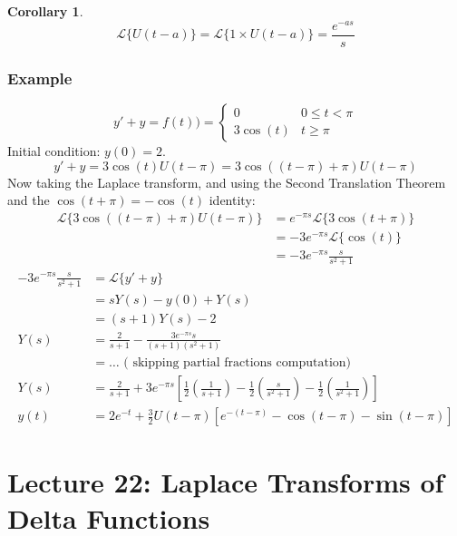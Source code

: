 \documentclass[11pt]{article}
\newtheorem{cor}[thm]{Corollary}
\newcommand{\lap}{\mathcal{L}}
\begin{document}
	\begin{cor}
		\[
			\lap\{ U(t-a) \} = \lap\{ 1 \times U(t-a) \} = \frac{e^{-as}}{s}
		\]
	\end{cor}

\subsubsection{Example}
		\[
			y' + y = f(t)) = \left\{
				\begin{array}{cc}
					0 & 0 \leq t < \pi \\
					3 \cos (t) & t \geq \pi
				\end{array}
			\right.
		\]
	Initial condition: $y(0) = 2$.
		$$ y' + y = 3 \cos (t) U(t-\pi) = 3 \cos((t-\pi) + \pi) U(t-\pi) $$
	Now taking the Laplace transform, and using the Second Translation Theorem and the $\cos(t + \pi) = - \cos(t)$ identity:
		\begin{align*}
			\lap\{ 3 \cos((t-\pi) + \pi) U(t-\pi) \} &= e^{-\pi s} \lap\{3 \cos(t + \pi)\} \\
				&= - 3 e^{-\pi s} \lap\{\cos(t)\} \\
				&= -3 e^{-\pi s} \frac{s}{s^2 + 1}
		\end{align*}
		\begin{align*}
			-3 e^{-\pi s} \frac{s}{s^2 + 1} &= \lap\{y' + y\} \\
				&= sY(s) - y(0) + Y(s) \\
				&= (s+1)Y(s) - 2 \\
			Y(s) &= \frac{2}{s+1} - \frac{3 e^{-\pi s} s}{(s+1)(s^2 + 1)} \\
				&= \ldots \text{ ( skipping partial fractions computation)} \\
			Y(s) &= \frac{2}{s+1} + 3 e^{-\pi s} \left[\frac{1}{2} \left(\frac{1}{s+1} \right) - \frac{1}{2} \left(\frac{s}{s^2 + 1}\right) - \frac{1}{2} \left(\frac{1}{s^2+1}\right) \right] \\
			y(t) &= 2 e^{-t} + \frac{3}{2} U(t-\pi) \left[e^{-(t - \pi)} - \cos(t - \pi) - \sin(t - \pi)\right]
		\end{align*}

\section{Lecture 22: Laplace Transforms of Delta Functions}
\end{document}
